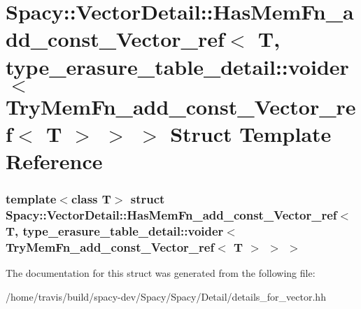 \hypertarget{structSpacy_1_1VectorDetail_1_1HasMemFn__add__const__Vector__ref_3_01T_00_01type__erasure__table77ad6f3ad50eb6edd23d7f70ad1273df}{\section{\-Spacy\-:\-:\-Vector\-Detail\-:\-:\-Has\-Mem\-Fn\-\_\-add\-\_\-const\-\_\-\-Vector\-\_\-ref$<$ \-T, type\-\_\-erasure\-\_\-table\-\_\-detail\-:\-:voider$<$ \-Try\-Mem\-Fn\-\_\-add\-\_\-const\-\_\-\-Vector\-\_\-ref$<$ \-T $>$ $>$ $>$ \-Struct \-Template \-Reference}
\label{structSpacy_1_1VectorDetail_1_1HasMemFn__add__const__Vector__ref_3_01T_00_01type__erasure__table77ad6f3ad50eb6edd23d7f70ad1273df}
}
\subsubsection*{template$<$class T$>$ struct Spacy\-::\-Vector\-Detail\-::\-Has\-Mem\-Fn\-\_\-add\-\_\-const\-\_\-\-Vector\-\_\-ref$<$ T, type\-\_\-erasure\-\_\-table\-\_\-detail\-::voider$<$ Try\-Mem\-Fn\-\_\-add\-\_\-const\-\_\-\-Vector\-\_\-ref$<$ T $>$ $>$ $>$}



\-The documentation for this struct was generated from the following file\-:\begin{DoxyCompactItemize}
\item 
/home/travis/build/spacy-\/dev/\-Spacy/\-Spacy/\-Detail/details\-\_\-for\-\_\-vector.\-hh\end{DoxyCompactItemize}
